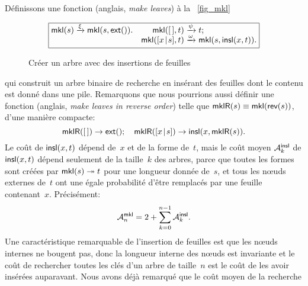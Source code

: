 \hspace*{-3pt} Définissons une fonction 
 (anglais, \emph{make leaves}) à la
\fig~\vref{fig_mkl}
\begin{figure}
\begin{equation*}
\boxed{
\begin{array}{@{}r@{\;}l@{\;}lr@{\;}l@{\;}l@{}}
  \fun{mkl}(s) & \xrightarrow{\smash{\xi}} & \fun{mkl}(s,\fun{ext}()).
& \fun{mkl}(\el,t) & \xrightarrow{\smash{\psi}} & t;\\
& & & \fun{mkl}(\cons{x}{s},t) & \xrightarrow{\smash{\omega}} & \fun{mkl}(s,\fun{insl}(x,t)).
\end{array}}
\end{equation*}
\caption{Créer un arbre avec des insertions de feuilles\label{fig_mkl}}
\end{figure}
qui construit un arbre binaire de recherche en insérant des feuilles
dont le contenu est donné dans une pile. Remarquons que nous pourrions
aussi définir une fonction 
(anglais, \emph{make leaves in reverse order}) telle que
\(\fun{mklR}(s) \equiv \fun{mkl}(\fun{rev}(s))\), d'une manière
compacte:
\begin{equation}
  \fun{mklR}(\el) \rightarrow \fun{ext}();
  \quad
  \fun{mklR}(\cons{x}{s}) \rightarrow \fun{insl}(x,\fun{mklR}(s)).
\label{eq_mklR}
\end{equation}
Le coût de \(\fun{insl}(x,t)\) dépend de~\(x\) et de la forme
de~\(t\), mais le coût moyen
\(\M{\fun{insl}}{k}\) de
\(\fun{insl}(x,t)\) dépend seulement de la taille~\(k\) des arbres,
parce que toutes les formes sont créées par \(\fun{mkl}(s)
\twoheadrightarrow t\) pour une longueur donnée de~\(s\), et tous les
n{\oe}uds externes de~\(t\) ont une égale probabilité d'être remplacés
par une feuille contenant~\(x\). Précisément:
\begin{equation}
\abovedisplayskip=2pt
\abovedisplayshortskip=2pt
\belowdisplayskip=4pt
\M{\fun{mkl}}{n} = 2 + \sum_{k=0}^{n-1}\M{\fun{insl}}{k}.
\label{eq_Mmkl0}
\end{equation}
Une caractéristique remarquable de l'insertion de feuilles est que les
n{\oe}uds internes ne bougent pas, donc la longueur
interne des
n{\oe}uds est invariante et le coût de rechercher toutes les clés d'un
arbre de taille~\(n\) est le coût de les avoir insérées
auparavant. Nous avons déjà remarqué que le coût moyen de la recherche
